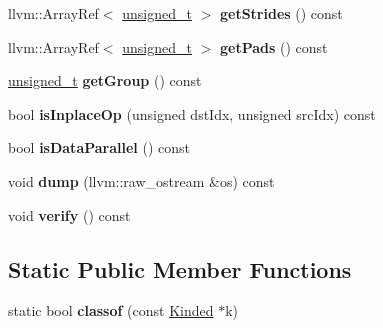 \begin{DoxyCompactItemize}
\item 
\mbox{\label{classglow_1_1_c_p_u_conv_d_k_k_c8_inst_abac725d1a5133e9708513fa3c739c00a}} 
llvm\+::\+Array\+Ref$<$ \hyperlink{namespaceglow_a0ca574644e1e42ef193a9947fb4d8911}{unsigned\+\_\+t} $>$ {\bfseries get\+Strides} () const
\item 
\mbox{\label{classglow_1_1_c_p_u_conv_d_k_k_c8_inst_aa095d36882717497616811de779fbf76}} 
llvm\+::\+Array\+Ref$<$ \hyperlink{namespaceglow_a0ca574644e1e42ef193a9947fb4d8911}{unsigned\+\_\+t} $>$ {\bfseries get\+Pads} () const
\item 
\mbox{\label{classglow_1_1_c_p_u_conv_d_k_k_c8_inst_a48c65e51e1ae8610d11652ef718321a2}} 
\hyperlink{namespaceglow_a0ca574644e1e42ef193a9947fb4d8911}{unsigned\+\_\+t} {\bfseries get\+Group} () const
\item 
\mbox{\label{classglow_1_1_c_p_u_conv_d_k_k_c8_inst_a973dec397d44072fbc7ae732910ccd90}} 
bool {\bfseries is\+Inplace\+Op} (unsigned dst\+Idx, unsigned src\+Idx) const
\item 
\mbox{\label{classglow_1_1_c_p_u_conv_d_k_k_c8_inst_a66c8a6430daa6b7dfc3d39a58318df12}} 
bool {\bfseries is\+Data\+Parallel} () const
\item 
\mbox{\label{classglow_1_1_c_p_u_conv_d_k_k_c8_inst_a6bd87a5f77cf5cc8114084904f06dc11}} 
void {\bfseries dump} (llvm\+::raw\+\_\+ostream \&os) const
\item 
\mbox{\label{classglow_1_1_c_p_u_conv_d_k_k_c8_inst_addb0df2c1204f0bb0b17c231e80c9cd4}} 
void {\bfseries verify} () const
\end{DoxyCompactItemize}
\subsection*{Static Public Member Functions}
\begin{DoxyCompactItemize}
\item 
\mbox{\label{classglow_1_1_c_p_u_conv_d_k_k_c8_inst_a4772a910c0f5857e3ed40c31d7e96b25}} 
static bool {\bfseries classof} (const \hyperlink{classglow_1_1_kinded}{Kinded} $\ast$k)
\end{DoxyCompactItemize}
